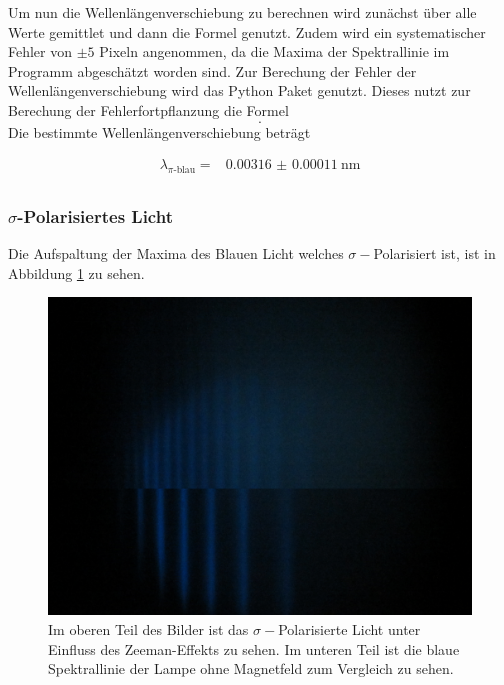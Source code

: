 Um nun die Wellenlängenverschiebung zu berechnen wird zunächst über alle Werte gemittlet und dann die Formel
%
genutzt.
Zudem wird ein systematischer Fehler von $\pm 5$ Pixeln angenommen, da die Maxima der Spektrallinie im Programm \cite{paint3d} abgeschätzt worden sind.
Zur Berechung der Fehler der Wellenlängenverschiebung wird das Python Paket \cite{uncertainties} genutzt.
Dieses nutzt zur Berechung der Fehlerfortpflanzung die Formel
\begin{equation}
    .
    \label{eq:fehler_Wellenlängenverschiebung}
\end{equation}
Die bestimmte Wellenlängenverschiebung beträgt

\begin{align*}
    \lambda _\text{$\pi$-blau} = & \SI{0.00316(011)}{\nano\meter} \\
\end{align*}

\subsubsection{\texorpdfstring{$\sigma$}{\textsigma}-Polarisiertes Licht}

Die Aufspaltung der Maxima des Blauen Licht welches $\sigma -$Polarisiert ist, ist in Abbildung \ref{fig:sigma-blau} zu sehen.

\begin{figure}
    \centering
    \includegraphics[width=\textwidth]{content/data/Blue_sigma_0_uebernander.JPG}
    \caption{Im oberen Teil des Bilder ist das $\sigma -$Polarisierte Licht unter Einfluss des Zeeman-Effekts zu sehen. Im unteren Teil ist die blaue Spektrallinie der Lampe ohne Magnetfeld zum Vergleich zu sehen.}
    \label{fig:sigma-blau}
\end{figure}

